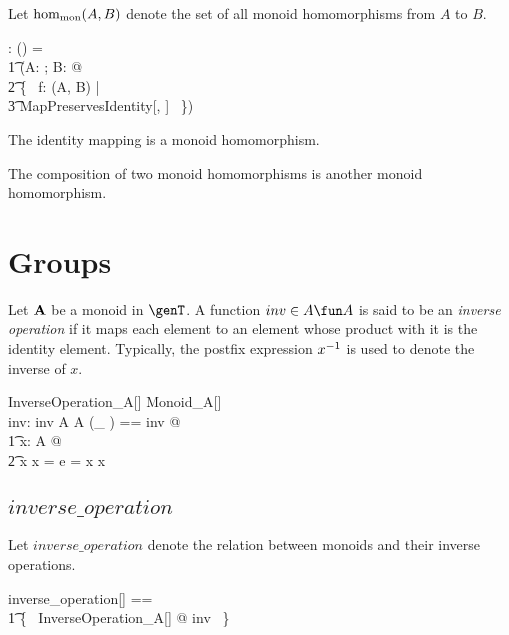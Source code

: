 \documentclass{amsart}
\begin{document}
Let $\operatorname{hom_{mon}}(A, B)$ denote the set of all monoid homomorphisms from $A$ to $B$.

\begin{gendef}[\genT, \genU]
\homMonoid: \monoid \genT \cross \monoid \genU \fun \power (\genT \fun \genU)
\where
\homMonoid = \\
\t1	(\lambda A: \monoid \genT; B: \monoid \genU @ \\
\t2		\{~ f: \homSemigroup(A, B) | \\
\t3			MapPreservesIdentity[\genT, \genU] ~\})
\end{gendef}

\begin{remark}
The identity mapping is a monoid homomorphism.
\end{remark}

\begin{remark}
The composition of two monoid homomorphisms is another monoid homomorphism.
\end{remark}

\section{Groups}

Let $\mathbf{A}$ be a monoid in $\genT$.
A function $inv \in A \fun A$ is said to be an \textit{inverse operation} if it maps each element
to an element whose product with it is the identity element.
Typically, the postfix expression $x ^{-1}$ is used to denote the inverse of $x$.

\begin{schema}{InverseOperation\_A}[\genT]
	Monoid\_A[\genT] \\
	inv: \genT \pfun \genT
\where
	inv \in A \fun A
\also
	\LET (\_ \invG) == inv @ \\
	\t1	\forall x: A @ \\
	\t2		x \mulA x \invG = e = x \invG  \mulA x
\end{schema}

\subsection{$inverse\_operation$}

Let $inverse\_operation$ denote the relation between monoids and their inverse operations.
\begin{zed}
inverse\_operation[\genT] == \\
\t1	\{~ InverseOperation\_A[\genT] @ \strucA \mapsto inv ~\}
\end{zed}
\end{document}
